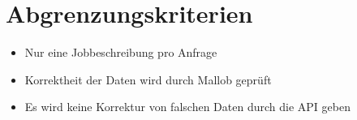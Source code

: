\section{Abgrenzungskriterien}
    \begin{itemize}
        \item Nur eine Jobbeschreibung pro Anfrage
        \item Korrektheit der Daten wird durch Mallob geprüft
        \item Es wird keine Korrektur von falschen Daten durch die API geben
    \end{itemize}










\printnoidxglossaries

